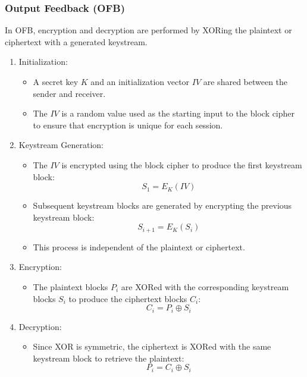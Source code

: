 \subsubsection{Output Feedback (OFB)}
In OFB, encryption and decryption are performed by XORing the plaintext or ciphertext with a generated keystream. 
\begin{enumerate}
    \item Initialization:
    \begin{itemize}
        \item A secret key \( K \) and an initialization vector \( IV \) are shared between the sender and receiver.
        \item The \( IV \) is a random value used as the starting input to the block cipher to ensure that encryption is unique for each session.
    \end{itemize}

    \item Keystream Generation:
    \begin{itemize}
        \item The \( IV \) is encrypted using the block cipher to produce the first keystream block:
        \[
        S_1 = E_K(IV)
        \]
        \item Subsequent keystream blocks are generated by encrypting the previous keystream block:
        \[
        S_{i+1} = E_K(S_i)
        \]
        \item This process is independent of the plaintext or ciphertext.
    \end{itemize}

    \item Encryption:
    \begin{itemize}
        \item The plaintext blocks \( P_i \) are XORed with the corresponding keystream blocks \( S_i \) to produce the ciphertext blocks \( C_i \):
        \[
        C_i = P_i \oplus S_i
        \]
    \end{itemize}

    \item Decryption:
    \begin{itemize}
        \item Since XOR is symmetric, the ciphertext is XORed with the same keystream block to retrieve the plaintext:
        \[
        P_i = C_i \oplus S_i
        \]
    \end{itemize}
\end{enumerate}

